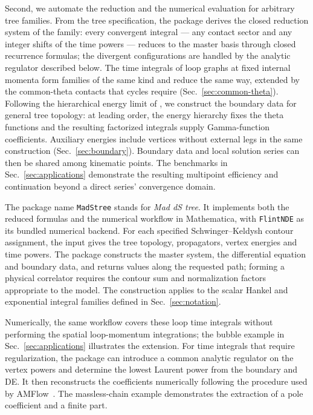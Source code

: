 \documentclass[11pt,a4paper]{article}
\numberwithin{table}{section}
\begin{document}
Second, we automate the reduction and the numerical evaluation for arbitrary tree families.
From the tree specification, the package derives the closed reduction system of the family:
every convergent integral --- any contact sector and any integer shifts of the time powers ---
reduces to the master basis through closed recurrence formulas; the divergent configurations
are handled by the analytic regulator described below. The time integrals of loop
graphs at fixed internal momenta form families of the same kind and reduce the same way,
extended by the common-theta contacts that cycles require (Sec.~\ref{sec:common-theta}).
Following the hierarchical energy limit of \cite{Chen:2024glu}, we construct the
boundary data for general tree topology: at leading order, the energy hierarchy fixes the
theta functions and the resulting factorized integrals supply Gamma-function coefficients.
Auxiliary energies include vertices without external legs in the same construction
(Sec.~\ref{sec:boundary}). Boundary data and local solution series can then be shared among
kinematic points. The benchmarks in Sec.~\ref{sec:applications} demonstrate the resulting
multipoint efficiency and continuation beyond a direct series' convergence domain.

The package name \texttt{MadStree} stands for \emph{Mad dS tree}. It implements both the
reduced formulas and the numerical workflow in Mathematica, with \texttt{FlintNDE} as its
bundled numerical backend. For each specified Schwinger--Keldysh contour assignment, the
input gives the tree topology, propagators, vertex energies and time powers. The package
constructs the master system, the differential equation and boundary data, and returns values
along the requested path;
forming a physical correlator requires the contour sum and normalization factors appropriate
to the model. The construction applies to the scalar Hankel and exponential integral families
defined in Sec.~\ref{sec:notation}.

Numerically, the same workflow covers these loop time integrals without performing the
spatial loop-momentum integrations; the bubble example in Sec.~\ref{sec:applications}
illustrates the extension. For time integrals that require regularization, the package can
introduce a common analytic regulator on the vertex powers and determine the lowest Laurent power
from the boundary and DE. It then reconstructs the coefficients numerically following the procedure
used by AMFlow~\cite{Liu:2022chg,Huang:2026rjb}. The massless-chain
example demonstrates the extraction of a pole coefficient and a finite part.
\end{document}
